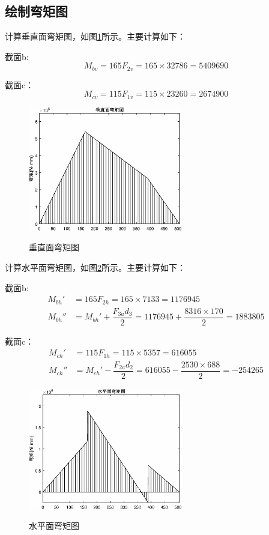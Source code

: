 	\subsection{绘制弯矩图}
	计算垂直面弯矩图，如图\ref{wan-v}所示。主要计算如下：

	截面b:
		\[M_{bv} = 165F_{2v} = 165\times 32786 = 5409690\]

	截面c：
		\[M_{cv} = 115F_{1v} = 115\times 23260 = 2674900\]

	\begin{figure}[H]
		\centering
		\includegraphics[width=0.6\textwidth]{./pic/wan_v.eps}\\
		\caption{垂直面弯矩图}\label{wan-v}
	\end{figure}

	计算水平面弯矩图，如图\ref{wan-h}所示。主要计算如下：

	截面b:
		\begin{align}
			M_{bh}' &= 165F_{2h} = 165\times 7133 = 1176945\\
			M_{bh}'' &= M_{bh}'+ \dfrac{F_{3a}d_3}{2} = 1176945+ \dfrac{8316\times 170}{2} = 1883805
		\end{align}
		
	截面c：
		\begin{align}
			M_{ch}' &= 115F_{1h} = 115\times 5357 = 616055\\
			M_{ch}'' &= M_{ch}' - \dfrac{F_{2a}d_2}{2} = 616055 - \dfrac{2530\times 688}{2} = -254265
		\end{align}

	\begin{figure}[H]
		\centering
		\includegraphics[width=0.6\textwidth]{./pic/wan_h.eps}\\
		\caption{水平面弯矩图}\label{wan-h}
	\end{figure}

